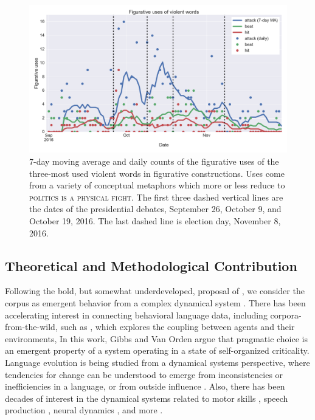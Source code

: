 \begin{figure}
\begin{center}
  \hspace*{-.25in}
  \includegraphics[width=\textwidth]{figures/fig_uses_violent_words-FIG1.pdf}
\end{center}
\caption{
  7-day moving average and daily counts of the figurative uses of the three-most
  used violent words in figurative constructions. Uses come from a variety of
  conceptual metaphors which more or less reduce to 
  \textsc{politics is a physical fight}. The first three dashed 
  vertical lines are the dates of the presidential debates, 
  September 26, October 9, and October 19, 2016. The last dashed
  line is election day, November 8, 2016.
}
\label{fig:timeseries}
\end{figure}

\subsection{Theoretical and Methodological Contribution}
\label{sub:Theoretical-and-Methodological-Contribution}

Following the bold, but somewhat underdeveloped, proposal of ,
we consider the corpus as emergent behavior from a complex dynamical system \cite{Beer2000}.
There has been accelerating interest in connecting behavioral language data,
including corpora-from-the-wild, such as , which explores 
the coupling between agents and their environments, 
In this work, Gibbs and Van Orden argue that pragmatic choice is an
emergent property of a system operating in a state of self-organized 
criticality. Language evolution is being studied from a dynamical systems perspective, 
where tendencies for change
can be understood to emerge from inconsistencies or inefficiencies in a 
language, or from outside influence \cite{Dale2016}. Also, there has been decades of interest
in the dynamical systems related to motor skills \cite{Haken1985}, speech 
production \cite{Kelso1986}, neural dynamics \cite{Chialvo2010}, and more
\cite{Spivey2007}. 

